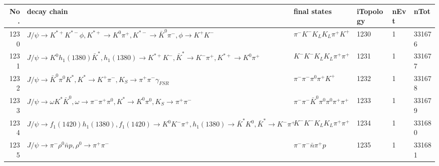\begin{table}[htbp] 
\begin{center}
\begin{small}
\begin{tabular}{rlllll}\hline\hline
 No. & decay chain & final states &  iTopology & nEvt & nTot \\\hline
1230&$J/\psi       \rightarrow K^{*+}         K^{*-}         \phi           , K^{*+}          \rightarrow K^{0}          \pi^{+}        , K^{*-}          \rightarrow \bar{K}^{0}   \pi^{-}        , \phi            \rightarrow K^{+}          K^{-}          $&$\pi^{-}        K^{-}          K_{L}          K_{L}          \pi^{+}        K^{+}          $& 1230&    1&331676\\
1231&$J/\psi       \rightarrow K^{0}          h_{1}(1380)    \bar{K}^{*}   , h_{1}(1380)     \rightarrow K^{*+}         K^{-}          , \bar{K}^{*}    \rightarrow K^{-}          \pi^{+}        , K^{*+}          \rightarrow K^{0}          \pi^{+}        $&$K^{-}          K^{-}          K_{L}          K_{L}          \pi^{+}        \pi^{+}        $& 1231&    1&331677\\
1232&$J/\psi       \rightarrow \bar{K}^{0}   \pi^{0}        K^{*}          , K^{*}           \rightarrow K^{+}          \pi^{-}        , K_{S}           \rightarrow \pi^{+}        \pi^{-}        \gamma_{FSR} $&$\pi^{-}        \pi^{-}        \pi^{0}        \pi^{+}        K^{+}          $& 1232&    1&331678\\
1233&$J/\psi       \rightarrow \omega         K^{*}          \bar{K}^{0}   , \omega          \rightarrow \pi^{-}        \pi^{+}        \pi^{0}        , K^{*}           \rightarrow K^{0}          \pi^{0}        , K_{S}           \rightarrow \pi^{+}        \pi^{-}        $&$\pi^{-}        \pi^{-}        \bar{K}^{0}   \pi^{0}        \pi^{0}        \pi^{+}        \pi^{+}        $& 1233&    1&331679\\
1234&$J/\psi       \rightarrow f_{1}(1420)    h_{1}(1380)    , f_{1}(1420)     \rightarrow K^{0}          K^{-}          \pi^{+}        , h_{1}(1380)     \rightarrow \bar{K}^{*}   K^{0}          , \bar{K}^{*}    \rightarrow K^{-}          \pi^{+}        $&$K^{-}          K^{-}          K_{L}          K_{L}          \pi^{+}        \pi^{+}        $& 1234&    1&331680\\
1235&$J/\psi       \rightarrow \pi^{-}        \rho^{0}      \bar{n}          p                 , \rho^{0}       \rightarrow \pi^{+}        \pi^{-}        $&$\pi^{-}        \pi^{-}        \bar{n}          \pi^{+}        p                 $& 1235&    1&331681\\

\end{tabular}
\end{small}
\end{center}
\end{table}
